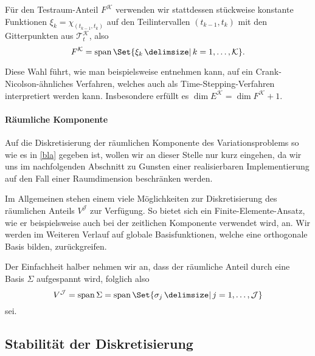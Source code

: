 Für den Testraum-Anteil $F^{\mathcal K}$ verwenden wir stattdessen stückweise konstante Funktionen $\xi_{k} = \chi_{(t_{k-1}, t_{k})}$ auf den Teilintervallen $(t_{k-1}, t_{k})$ mit den Gitterpunkten aus $\mathcal T^{\mathcal K}_{t}$, also
\begin{equation}
    F^{\mathcal K} = \spn\Set{\xi_{k} \given k = 1, \dots, \mathcal K}.
\end{equation}

Diese Wahl führt, wie man beispielsweise \cite{Andreev:2013gk} entnehmen kann, auf ein Crank-Nicolson-ähnliches Verfahren, welches auch als Time-Stepping-Verfahren interpretiert werden kann.
Insbesondere erfüllt es $\dim E^{\mathcal K} = \dim F^{\mathcal K} + 1$.

\paragraph{Räumliche Komponente} %
\label{par:r_umliche_unterraeume}

Auf die Diskretisierung der räumlichen Komponente des Variationsproblems so wie es in \cref{bla} gegeben ist, wollen wir an dieser Stelle nur kurz eingehen, da wir uns im nachfolgenden Abschnitt zu Gunsten einer realisierbaren Implementierung auf den Fall einer Raumdimension beschränken werden.

Im Allgemeinen stehen einem viele Möglichkeiten zur Diskretisierung des räumlichen Anteils $V^{\mathcal J}$ zur Verfügung.
So bietet sich ein Finite-Elemente-Ansatz, wie er beispielsweise auch bei der zeitlichen Komponente verwendet wird, an.
Wir werden im Weiteren Verlauf auf globale Basisfunktionen, welche eine orthogonale Basis bilden, zurückgreifen.

Der Einfachheit halber nehmen wir an, dass der räumliche Anteil durch eine Basis $\Sigma$ aufgespannt wird, folglich also
\begin{equation}
    V^{\mathcal J} = \spn \Sigma = \spn\Set{\sigma_{j} \given j = 1, \dots, \mathcal J}
\end{equation}
sei.



\subsection{Stabilität der Diskretisierung} %
\label{sub:stabilit_t_der_diskretisierung}



